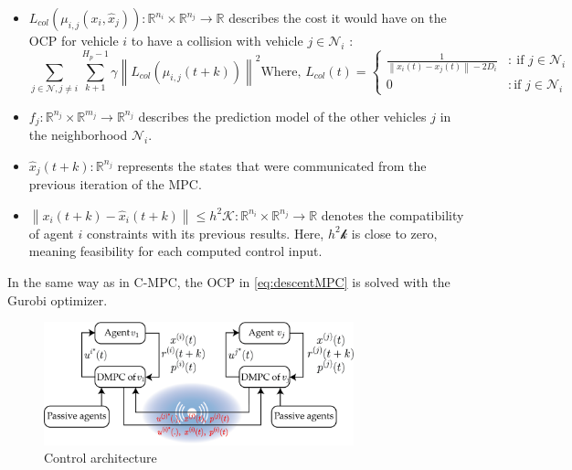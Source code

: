 \begin{itemize}
    \item $L_{col}(\mu_{i,j}(x_i, \hat{x}_j)): \mathbb{R}^{n_i}\times \mathbb{R}^{n_j} \to \mathbb{R}$ describes the cost it would have on the OCP for vehicle $i$ to have a collision with vehicle $j \in \mathcal{N}_i$ :
    \begin{equation*}
        \sum_{j \in \mathcal{N}, j \neq i} \sum_{k+1}^{H_p -1 }\gamma \left\| L_{col}(\mu_{i,j}(t+k)) \right\|^2  \text{Where, } L_{col}(t) = \left\{ \begin{array}{cl}
\frac{1}{\left\| x_i(t) - x_j (t)\right\| -2D_i} & : \ \text{if  } j \in \mathcal{N}_i\\
0 & :\text{if } j \in \mathcal{N}_i
\end{array} \right. 
    \end{equation*}
    \item $f_j: \mathbb{R}^{n_j}\times \mathbb{R}^{m_j} \to \mathbb{R}^{n_j}$ describes the prediction model of the other vehicles $j$ in the neighborhood $\mathcal{N}_i$.
    \item $\hat{x}_j(t+k): \mathbb{R}^{n_j}$ represents the states that were communicated from the previous iteration of the MPC.
    \item $\left\| x_i(t+k) - \hat{x}_i (t+k)\right\| \le h^2 \mathcal{K}:\mathbb{R}^{n_i} \times \mathbb{R}^{n_j} \to \mathbb{R}$ denotes the compatibility of agent $i$ constraints with its previous results. Here, $h^2 \mathcal{k}$ is close to zero, meaning feasibility for each computed control input.
\end{itemize}

In the same way as in C-MPC, the OCP in \ref{eq:descentMPC} is solved with the Gurobi optimizer. 



\begin{figure}[H]
    \centering
    \includegraphics[width=0.8\textwidth]{Kap4/DMPC.png}
    \caption{Control architecture}
    \label{fig:DMPC}
\end{figure}

